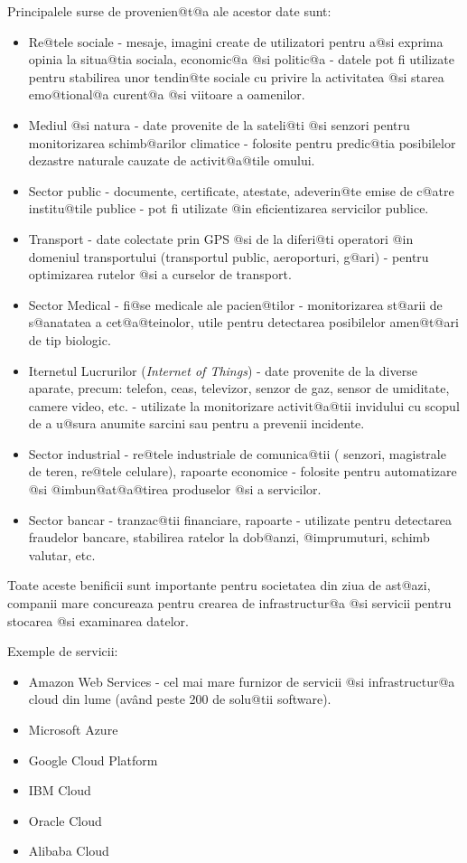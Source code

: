 Principalele surse de provenien@t@a ale acestor date sunt:
\begin{itemize}
	\item Re@tele sociale - mesaje, imagini create de utilizatori pentru a@si exprima opinia la situa@tia sociala, economic@a @si politic@a - datele pot fi utilizate pentru stabilirea unor tendin@te sociale cu privire la activitatea @si starea emo@tional@a curent@a @si viitoare a oamenilor.
	\item Mediul @si natura - date provenite de la sateli@ti @si senzori pentru monitorizarea schimb@arilor climatice - folosite pentru predic@tia posibilelor dezastre naturale cauzate de activit@a@tile omului.
	\item Sector public - documente, certificate, atestate, adeverin@te emise de c@atre institu@tile publice - pot fi utilizate @in eficientizarea servicilor publice.
	\item Transport - date colectate prin GPS @si de la diferi@ti operatori @in domeniul transportului (transportul public, aeroporturi, g@ari) - pentru optimizarea rutelor @si a curselor de transport.
	\item Sector Medical - fi@se medicale ale pacien@tilor - monitorizarea st@arii de s@anatatea a cet@a@teinolor, utile pentru detectarea posibilelor amen@t@ari de tip biologic.
	\item Iternetul Lucrurilor ({\sl Internet of Things}) - date provenite de la diverse aparate, precum: telefon, ceas, televizor, senzor de gaz, sensor de umiditate, camere video, etc. - utilizate la monitorizare activit@a@tii invidului cu scopul de a u@sura anumite sarcini sau pentru a prevenii incidente.
	\item Sector industrial - re@tele industriale de comunica@tii ( senzori, magistrale de teren, re@tele celulare), rapoarte economice - folosite pentru automatizare @si @imbun@at@a@tirea produselor @si a servicilor. 
	\item Sector bancar - tranzac@tii financiare, rapoarte - utilizate pentru detectarea fraudelor bancare, stabilirea ratelor la dob@anzi, @imprumuturi, schimb valutar, etc.
\end{itemize}

Toate aceste benificii sunt importante pentru societatea din ziua de ast@azi, companii mare concureaza pentru crearea de infrastructur@a @si servicii pentru stocarea @si examinarea datelor.

Exemple de servicii:

\begin{itemize}
	\item Amazon Web Services - cel mai mare furnizor de servicii @si infrastructur@a cloud din lume (av\^ and peste 200 de solu@tii software).
	\item Microsoft Azure 
	\item Google Cloud Platform
	\item IBM Cloud
	\item Oracle Cloud
	\item Alibaba Cloud
\end{itemize}

